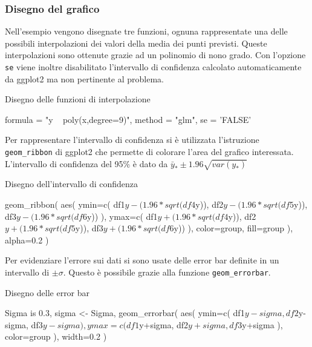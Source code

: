 \documentclass[10pt,titlepage,twoside,a4paper]{report}
\newenvironment{code}{\singlespacing\captionsetup{type=listing}}{}
\begin{document}
\subsubsection{Disegno del grafico}

Nell'esempio vengono disegnate tre funzioni, ognuna rappresentate una 
delle possibili interpolazioni dei valori della media dei punti previsti.
Queste interpolazioni sono ottenute grazie ad un polinomio di nono grado.
Con l'opzione \texttt{se} viene inoltre disabilitato l'intervallo di 
confidenza calcolato automaticamente da ggplot2 ma non pertinente al problema.

\begin{code}
\caption{Disegno delle funzioni di interpolazione}
\begin{rcode*}{}
formula = "y ~ poly(x,degree=9)",
method = "glm",
se = 'FALSE'
\end{rcode*}
\end{code}

Per rappresentare l'intervallo di confidenza si è utilizzata l'istruzione
\texttt{geom\_ribbon} di ggplot2 che permette di colorare l'area del grafico 
interessata. L'intervallo di confidenza del 95\% è dato da $\bar{y}_{\ast} \pm 
1.96\sqrt{var(y_{\ast})}$ 

\begin{code}
\caption{Disegno dell'intervallo di confidenza}
\begin{rcode*}{}
geom_ribbon(
    aes(
        ymin=c(
            df1$y-(1.96*sqrt(df4$y)),
            df2$y-(1.96*sqrt(df5$y)),
            df3$y-(1.96*sqrt(df6$y))
        ),
        ymax=c(
            df1$y+(1.96*sqrt(df4$y)),
            df2$y+(1.96*sqrt(df5$y)),
            df3$y+(1.96*sqrt(df6$y))
        ),
        color=group,
        fill=group
    ),
    alpha=0.2
)
\end{rcode*}
\end{code}

Per evidenziare l'errore sui dati si sono usate delle error bar definite in un 
intervallo di $\pm \sigma$. Questo è possibile grazie alla funzione 
\texttt{geom\_errorbar}.

\begin{code}
\caption{Disegno delle error bar}
\begin{rcode*}{}
Sigma is 0.3,
sigma <- Sigma,
geom_errorbar(
    aes(
        ymin=c(
            df1$y-sigma,
            df2$y-sigma,
            df3$y-sigma
        ),
        ymax=c(
            df1$y+sigma,
            df2$y+sigma,
            df3$y+sigma
        ),
        color=group
    ),
    width=0.2
)
\end{rcode*}
\end{code}
\end{document}
